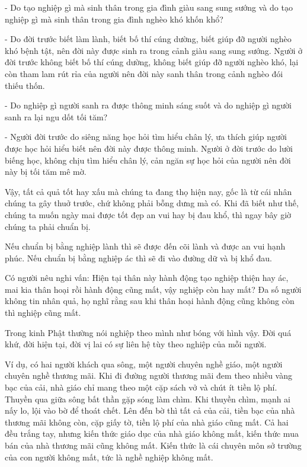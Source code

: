 \documentclass[
  12pt,
  oneside]{book}
\begin{document}
- Do tạo nghiệp gì mà sinh thân trong gia đình giàu sang sung sướng và do tạo nghiệp gì mà sinh thân trong gia đình nghèo khó khốn khổ?

- Do đời trước biết làm lành, biết bố thí cúng dường, biết giúp đỡ người nghèo khó bệnh tật, nên đời này được sinh ra trong cảnh giàu sang sung sướng. Người ở đời trước không biết bố thí cúng dường, không biết giúp đỡ người nghèo khó, lại còn tham lam rút rỉa của người nên đời này sanh thân trong cảnh nghèo đói thiếu thốn.

- Do nghiệp gì người sanh ra được thông minh sáng suốt và do nghiệp gì người sanh ra lại ngu dốt tối tăm?

- Người đời trước do siêng năng học hỏi tìm hiểu chân lý, ưa thích giúp người được học hỏi hiểu biết nên đời này được thông minh. Người ở đời trước do lười biếng học, không chịu tìm hiểu chân lý, cản ngăn sự học hỏi của người nên đời này bị tối tăm mê mờ.

Vậy, tất cả quả tốt hay xấu mà chúng ta đang thọ hiện nay, gốc là từ cái nhân chúng ta gây thuở trước, chứ không phải bỗng dưng mà có. Khi đã biết như thế, chúng ta muốn ngày mai được tốt đẹp an vui hay bị đau khổ, thì ngay bây giờ chúng ta phải chuẩn bị.

Nếu chuẩn bị bằng nghiệp lành thì sẽ được đến cõi lành và được an vui hạnh phúc. Nếu chuẩn bị bằng nghiệp ác thì sẽ đi vào đường dữ và bị khổ đau.

Có người nêu nghi vấn: Hiện tại thân này hành động tạo nghiệp thiện hay ác, mai kia thân hoại rồi hành động cũng mất, vậy nghiệp còn hay mất? Đa số người không tin nhân quả, họ nghĩ rằng sau khi thân hoại hành động cũng không còn thì nghiệp cũng mất.

Trong kinh Phật thường nói nghiệp theo mình như bóng với hình vậy. Đời quá khứ, đời hiện tại, đời vị lai có sự liên hệ tùy theo nghiệp của mỗi người.

Ví dụ, có hai người khách qua sông, một người chuyên nghề giáo, một người chuyên nghề thương mãi. Khi đi đường người thương mãi đem theo nhiều vàng bạc của cải, nhà giáo chỉ mang theo một cặp sách vở và chút ít tiền lộ phí. Thuyền qua giữa sông bất thần gặp sóng làm chìm. Khi thuyền chìm, mạnh ai nấy lo, lội vào bờ để thoát chết. Lên đến bờ thì tất cả của cải, tiền bạc của nhà thương mãi không còn, cặp giấy tờ, tiền lộ phí của nhà giáo cũng mất. Cả hai đều trắng tay, nhưng kiến thức giáo dục của nhà giáo không mất, kiến thức mua bán của nhà thương mãi cũng không mất. Kiến thức là cái chuyên môn sở trường của con người không mất, tức là nghề nghiệp không mất.
\end{document}
